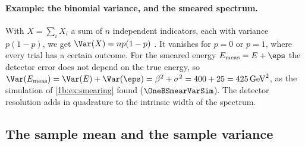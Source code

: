 \paragraph{Example: the binomial variance, and the smeared spectrum.}
With $X=\sum_iX_i$ a sum of $n$ independent indicators, each with variance
$p(1-p)$, we get $\Var(X)=np(1-p)$ . It vanishes for
$p=0$ or $p=1$, where every trial has a certain outcome. For the smeared
energy $E_{\rm meas}=E+\eps$ the detector error does not depend on the true
energy, so $\Var(E_{\rm meas})=\Var(E)+\Var(\eps)=\beta^2+\sigma^2=400+25=425\,
\mathrm{GeV}^2$, as the simulation of \cref{1b:ex:smearing} found
($\OneBSmearVarSim$). The detector resolution adds in quadrature to the
intrinsic width of the spectrum.

\subsection{The sample mean and the sample variance}

